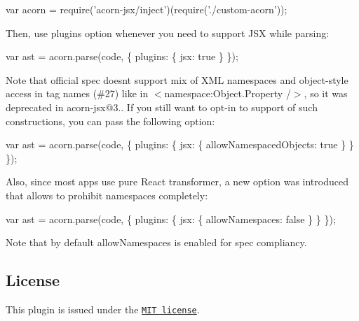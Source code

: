 \begin{DoxyCode}
var acorn = require('acorn-jsx/inject')(require('./custom-acorn'));
\end{DoxyCode}


Then, use {\ttfamily plugins} option whenever you need to support J\+SX while parsing\+:


\begin{DoxyCode}
var ast = acorn.parse(code, \{
  plugins: \{ jsx: true \}
\});
\end{DoxyCode}


Note that official spec doesn\textquotesingle{}t support mix of X\+ML namespaces and object-\/style access in tag names (\#27) like in {\ttfamily $<$namespace\+:Object.\+Property /$>$}, so it was deprecated in {\ttfamily acorn-\/jsx@3.}. If you still want to opt-\/in to support of such constructions, you can pass the following option\+:


\begin{DoxyCode}
var ast = acorn.parse(code, \{
  plugins: \{
    jsx: \{ allowNamespacedObjects: true \}
  \}
\});
\end{DoxyCode}


Also, since most apps use pure React transformer, a new option was introduced that allows to prohibit namespaces completely\+:


\begin{DoxyCode}
var ast = acorn.parse(code, \{
  plugins: \{
    jsx: \{ allowNamespaces: false \}
  \}
\});
\end{DoxyCode}


Note that by default {\ttfamily allow\+Namespaces} is enabled for spec compliancy.

\subsection*{License}

This plugin is issued under the \href{./LICENSE}{\tt M\+IT license}. 